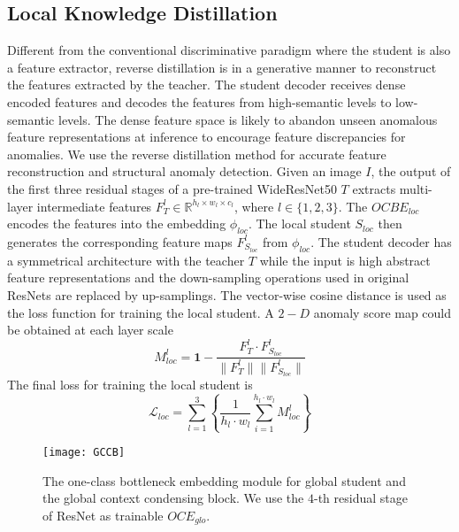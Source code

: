 \documentclass[10pt,twocolumn,letterpaper]{article}
\begin{document}
\subsection{Local Knowledge Distillation}
Different from the conventional discriminative paradigm where the student is also a feature extractor, reverse distillation \cite{deng2022anomaly} is in a generative manner to reconstruct the features extracted by the teacher. The student decoder receives dense encoded features and decodes the features from high-semantic levels to low-semantic levels. The dense feature space is likely to abandon unseen anomalous feature representations at inference to encourage feature discrepancies for anomalies. We use the reverse distillation \cite{deng2022anomaly} method for accurate feature reconstruction and structural anomaly detection.
Given an image $I$, the output of the first three residual stages of a pre-trained WideResNet50 \cite{zagoruyko2016wide} $T$ extracts multi-layer intermediate features $F_T^l \in \mathbb{R}^{h_l \times w_l \times c_l}$, where $l \in \{1, 2, 3\}$. The $OCBE_{loc}$ encodes the features into the embedding  $\phi_{loc}$. The local student $S_{loc}$ then generates the corresponding feature maps $F_{S_{loc}}^l$ from $\phi_{loc}$. The student decoder has a symmetrical architecture with the teacher $T$ while the input is high abstract feature representations and the down-sampling operations used in original ResNets \cite{he2016deep} are replaced by up-samplings. The vector-wise cosine distance is used as the loss function for training the local student. A $2-D$ anomaly score map could be obtained at each layer scale  
\begin{equation}
\label{map_loc}
    M_{loc}^l = \mathbf{1} - \frac{F_T^l \cdot F_{S_{loc}}^l}{\|F_T^l\| \| F_{S_{loc}}^l \|}
\end{equation}
The final loss for training the local student is 
\begin{equation}
    \mathcal{L}_{loc} = \sum_{l=1}^{3}\left\{\frac{1}{h_l \cdot w_l}\sum_{i=1}^{h_l \cdot w_l} M_{loc}^l \right\}
\end{equation}




\begin{figure}[t]
  \centering
   \texttt{[image: GCCB]}

   \caption{The one-class bottleneck embedding module for global student and the global context condensing block. We use the $4$-th residual stage of ResNet as trainable $OCE_{glo}$.}
   \label{fig_gccb}
\end{figure}
\end{document}
